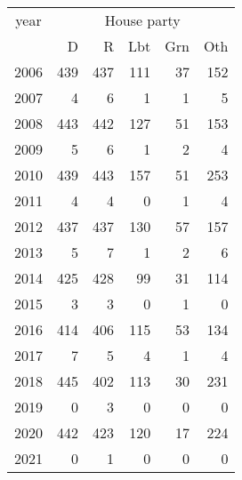 \footnotesize\begin{tabular}[t]{lrrrrr}
\toprule
\multicolumn{1}{c}{year} & \multicolumn{5}{c}{House party} \\
\cmidrule(l{3pt}r{3pt}){1-1} \cmidrule(l{3pt}r{3pt}){2-6}
  & D & R & Lbt & Grn & Oth\\
\midrule
2006 & 439 & 437 & 111 & 37 & 152\\
2007 & 4 & 6 & 1 & 1 & 5\\
2008 & 443 & 442 & 127 & 51 & 153\\
2009 & 5 & 6 & 1 & 2 & 4\\
2010 & 439 & 443 & 157 & 51 & 253\\
2011 & 4 & 4 & 0 & 1 & 4\\
2012 & 437 & 437 & 130 & 57 & 157\\
2013 & 5 & 7 & 1 & 2 & 6\\
2014 & 425 & 428 & 99 & 31 & 114\\
2015 & 3 & 3 & 0 & 1 & 0\\
2016 & 414 & 406 & 115 & 53 & 134\\
2017 & 7 & 5 & 4 & 1 & 4\\
2018 & 445 & 402 & 113 & 30 & 231\\
2019 & 0 & 3 & 0 & 0 & 0\\
2020 & 442 & 423 & 120 & 17 & 224\\
2021 & 0 & 1 & 0 & 0 & 0\\
\bottomrule
\end{tabular}
